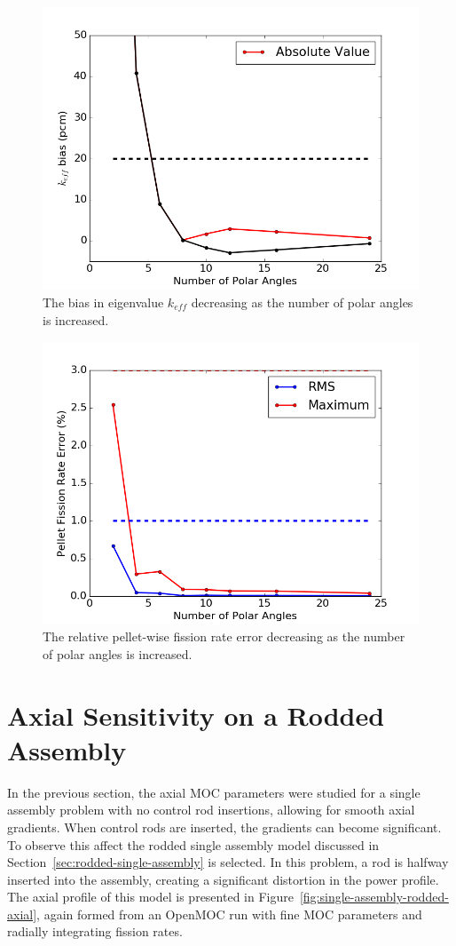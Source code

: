 \begin{figure}[h!]
	\centering
	\includegraphics[width=0.7\linewidth]{figures/results/sensitivity/polar_angles_pcm.png}
	\caption[]{The bias in eigenvalue $k_{\textit{eff}}$ decreasing as the number of polar angles is increased.}
	\label{fig:polar-angles-pcm}
\end{figure}
\begin{figure}[h!]
	\centering
	\includegraphics[width=0.7\linewidth]{figures/results/sensitivity/polar_angles_fr.png}
	\caption[]{The relative pellet-wise fission rate error decreasing as the number of polar angles is increased.}
	\label{fig:polar-angles-fr}
\end{figure}


\newpage
\section{Axial Sensitivity on a Rodded Assembly}
\label{sec:axial-sensitivity-rodded}

In the previous section, the axial \ac{MOC} parameters were studied for a single assembly problem with no control rod insertions, allowing for smooth axial gradients. When control rods are inserted, the gradients can become significant. To observe this affect the rodded single assembly model discussed in Section~\ref{sec:rodded-single-assembly} is selected. In this problem, a rod is halfway inserted into the assembly, creating a significant distortion in the power profile. The axial profile of this model is presented in Figure~\ref{fig:single-assembly-rodded-axial}, again formed from an OpenMOC run with fine \ac{MOC} parameters and radially integrating fission rates.

